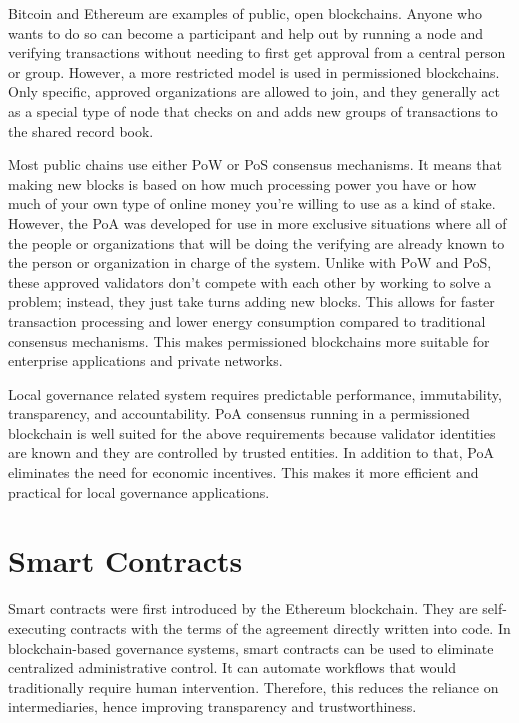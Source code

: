 Bitcoin and Ethereum are examples of public, open blockchains. Anyone who wants to do so can become a participant and help out by running a node and verifying transactions without needing to first get approval from a central person or group. However, a more restricted model is used in permissioned blockchains. Only specific, approved organizations are allowed to join, and they generally act as a special type of node that checks on and adds new groups of transactions to the shared record book.

Most public chains use either \ac{PoW} or \ac{PoS} consensus mechanisms. It means that making new blocks is based on how much processing power you have or how much of your own type of online money you're willing to use as a kind of stake. However, the \ac{PoA} was developed for use in more exclusive situations where all of the people or organizations that will be doing the verifying are already known to the person or organization in charge of the system. Unlike with \ac{PoW} and \ac{PoS}, these approved validators don't compete with each other by working to solve a problem; instead, they just take turns adding new blocks. This allows for faster transaction processing and lower energy consumption compared to traditional consensus mechanisms. This makes permissioned blockchains more suitable for enterprise applications and private networks.

Local governance related system requires predictable performance, immutability, transparency, and accountability. \ac{PoA} consensus running in a permissioned blockchain is well suited for the above requirements because validator identities are known and they are controlled by trusted entities. In addition to that, \ac{PoA} eliminates the need for economic incentives. This makes it more efficient and practical for local governance applications.


\section{Smart Contracts}

Smart contracts were first introduced by the Ethereum blockchain. They are self-executing contracts with the terms of the agreement directly written into code. In blockchain-based governance systems, smart contracts can be used to eliminate centralized administrative control. It can automate workflows that would traditionally require human intervention. Therefore, this reduces the reliance on intermediaries, hence improving transparency and trustworthiness.

